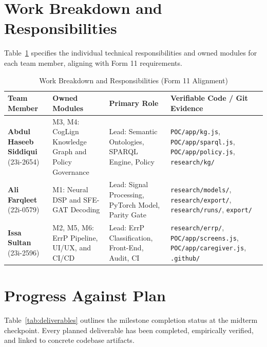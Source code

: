 \documentclass[12pt,a4paper]{report}
\begin{document}
\section{Work Breakdown and Responsibilities}
Table~\ref{tab:work_breakdown} specifies the individual technical responsibilities and owned modules for each team member, aligning with Form 11 requirements.

\begin{table}[H]
\centering
\small
\caption{Work Breakdown and Responsibilities (Form 11 Alignment)}
\label{tab:work_breakdown}
\begin{tabularx}{\textwidth}{p{3.2cm} p{4.2cm} p{3.0cm} X}
\toprule
\textbf{Team Member} & \textbf{Owned Modules} & \textbf{Primary Role} & \textbf{Verifiable Code / Git Evidence} \\
\midrule
\textbf{Abdul Haseeb Siddiqui} \newline (23i-2654) & M3, M4: CogLign Knowledge Graph and Policy Governance & Lead: Semantic Ontologies, SPARQL Engine, Policy & \texttt{POC/app/kg.js}, \texttt{POC/app/sparql.js}, \texttt{POC/app/policy.js}, \texttt{research/kg/} \\
\addlinespace
\textbf{Ali Farqleet} \newline (22i-0579) & M1: Neural DSP and SFE-GAT Decoding & Lead: Signal Processing, PyTorch Model, Parity Gate & \texttt{research/models/}, \texttt{research/export/}, \texttt{research/runs/}, \texttt{export/} \\
\addlinespace
\textbf{Issa Sultan} \newline (23i-2596) & M2, M5, M6: ErrP Pipeline, UI/UX, and CI/CD & Lead: ErrP Classification, Front-End, Audit, CI & \texttt{research/errp/}, \texttt{POC/app/screens.js}, \texttt{POC/app/caregiver.js}, \texttt{.github/} \\
\bottomrule
\end{tabularx}
\end{table}

\section{Progress Against Plan}
Table~\ref{tab:deliverables} outlines the milestone completion status at the midterm checkpoint. Every planned deliverable has been completed, empirically verified, and linked to concrete codebase artifacts.
\end{document}
